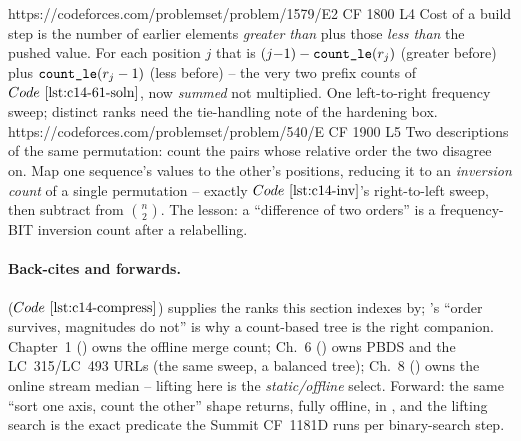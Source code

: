 \begin{practiceset}
    {https://codeforces.com/problemset/problem/1579/E2}
    {CF 1800 L4}
    {Cost of a build step is the number of earlier elements \emph{greater
     than} plus those \emph{less than} the pushed value.  For each position
     \(j\) that is \((j{-}1)-\texttt{count\_le}(r_j)\) (greater before) plus
     \(\texttt{count\_le}(r_j-1)\) (less before) -- the very two prefix counts
     of \(\coderef{c14-61-soln}\), now \emph{summed} not multiplied.  One
     left-to-right frequency sweep; distinct ranks need the tie-handling note
     of the hardening box.}
    {https://codeforces.com/problemset/problem/540/E}
    {CF 1900 L5}
    {Two descriptions of the same permutation: count the pairs whose
     relative order the two disagree on.  Map one sequence's values to the
     other's positions, reducing it to an \emph{inversion count} of a single
     permutation -- exactly \(\coderef{c14-inv}\)'s right-to-left sweep, then
     subtract from \(\binom{n}{2}\).  The lesson: a ``difference of two
     orders'' is a frequency-BIT inversion count after a relabelling.}
\end{practiceset}

\paragraph{Back-cites and forwards.}
 (\(\coderef{c14-compress}\)) supplies the ranks this
section indexes by; 's ``order survives, magnitudes do
not'' is why a count-based tree is the right companion.  Chapter~1
() owns the offline merge count; Ch.~6 () owns PBDS and
the LC~315/LC~493 URLs (the same sweep, a balanced tree); Ch.~8 ()
owns the online stream median -- lifting here is the \emph{static/offline}
select.  Forward: the same ``sort one axis, count the other'' shape returns,
fully offline, in , and the lifting search is the exact
predicate the Summit CF~1181D runs per binary-search step.

